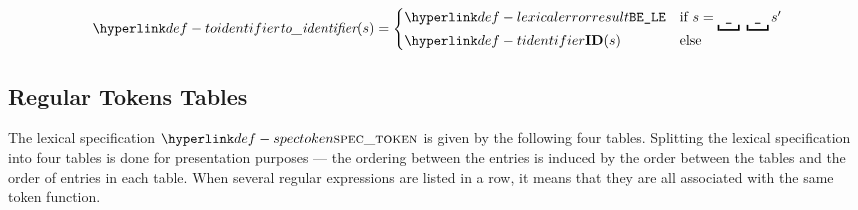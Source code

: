 \FormallyParagraph
\[
  \toidentifier(s) = \begin{cases}
    \LexicalError & \text{if }s = \underbracket{\texttt{ \_ } }\ \underbracket{\texttt{ \_ } } s'\\
    \Tidentifier(s) & \text{else}
  \end{cases}
\]

\subsection{Regular Tokens Tables}

\hypertarget{def-spectoken}{}
The lexical specification  $\spectoken$ is given by the following four tables.
Splitting the lexical specification into four tables is done for presentation purposes ---
the ordering between the entries is induced by the order between the tables
and the order of entries in each table.
%
When several regular expressions are listed in a row, it means that they are all associated with the same
token function.

